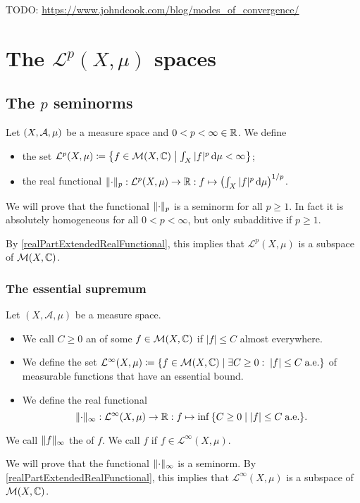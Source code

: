 TODO: \url{https://www.johndcook.com/blog/modes_of_convergence/}

\section{The $\mathcal{L}^p(X,\mu)$ spaces}
\subsection{The $p$ seminorms}
\begin{definition}
Let $\sSet{X,\mathcal{A},\mu}$ be a measure space and $0<p<\infty \in \mathbb{R}$. We define
\begin{itemize}
\item the set $\mathcal{L}^p(X,\mu) \defeq \setbuilder{f\in \meas(X,\C)}{\int_X |f|^p\diff{\mu} <\infty}$;
\item the real functional $\lVert\cdot\rVert_{p}: \mathcal{L}^p(X,\mu)\to \mathbb{R}: f\mapsto \left(\int_X |f|^p\operatorname{d \!}{\mu}\right)^{1/p}$.
\end{itemize}
\end{definition}
We will prove that the functional $\lVert\cdot\rVert_{p}$ is a seminorm for all $p \geq 1$. In fact it is absolutely homogeneous for all $0<p<\infty$, but only subadditive if $p\geq 1$.

By \ref{realPartExtendedRealFunctional}, this implies that $\mathcal{L}^p(X,\mu)$ is a subspace of $\operatorname{\mathcal{M}}(X,\mathbb{C})$.

\subsubsection{The essential supremum}
\begin{definition}
Let $(X, \mathcal{A}, \mu)$ be a measure space.
\begin{itemize}
\item We call $C \geq 0$ an  of some $f\in \operatorname{\mathcal{M}}(X,\mathbb{C})$ if $|f| \leq C$ almost everywhere.
\item We define the set $\mathcal{L}^\infty(X,\mu) \defeq \setbuilder{f\in \meas(X,\C)}{\exists C \geq 0: \; |f| \leq C \; \text{a.e.}}$ of measurable functions that have an essential bound.
\item We define the real functional
\[ \norm{\cdot}_{\infty}: \mathcal{L}^\infty(X,\mu)\to \R: f\mapsto \inf\setbuilder{C \geq 0}{|f| \leq C \; \text{a.e.}}. \]
\end{itemize}
We call $\lVert f\rVert_\infty$ the  of $f$. We call $f$  if $f\in \mathcal{L}^\infty(X,\mu)$.
\end{definition}
We will prove that the functional $\lVert\cdot\rVert_{\infty}$ is a seminorm. By \ref{realPartExtendedRealFunctional}, this implies that $\mathcal{L}^\infty(X,\mu)$ is a subspace of $\operatorname{\mathcal{M}}(X,\mathbb{C})$.

